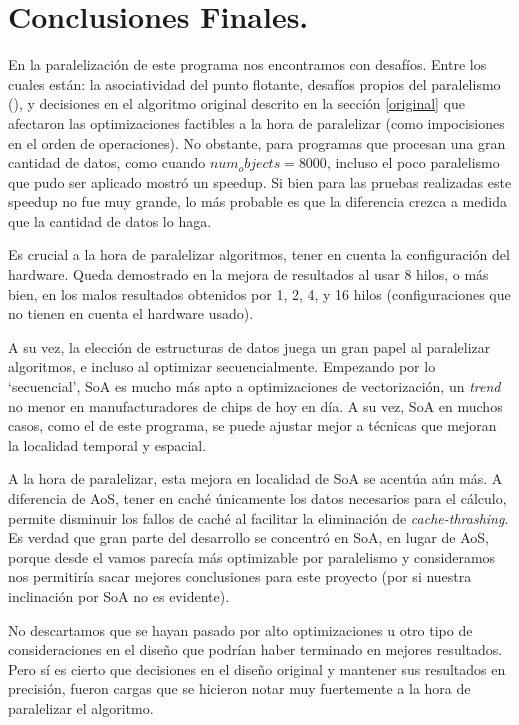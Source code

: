 \documentclass{article}
\begin{document}
\section{Conclusiones Finales.\label{conclusiones}}
En la paralelización de este programa nos encontramos con desafíos. Entre los cuales están: la asociatividad
del punto flotante, desafíos propios del paralelismo (), y decisiones en el algoritmo original descrito en
la sección \ref{original} que afectaron las optimizaciones factibles a la hora de paralelizar (como impocisiones
en el orden de operaciones). No obstante, para programas que procesan una gran cantidad de datos, como cuando ${num_objects=8000}$,
incluso el poco paralelismo que pudo ser aplicado mostró un speedup. Si bien para las pruebas realizadas este speedup no fue
muy grande, lo más probable es que la diferencia crezca a medida que la cantidad de datos lo haga.


Es crucial a la hora de paralelizar algoritmos, tener en cuenta la configuración del hardware. Queda demostrado
en la mejora de resultados al usar 8 hilos, o más bien, en los malos resultados obtenidos por 1, 2, 4, y 16 hilos (configuraciones
que no tienen en cuenta el hardware usado).


A su vez, la elección de estructuras de datos juega un gran papel al paralelizar algoritmos, e incluso al optimizar secuencialmente.
Empezando por lo `secuencial', SoA es mucho más apto a optimizaciones de vectorización, un \textit{trend} no menor en manufacturadores
de chips de hoy en día. A su vez, SoA en muchos casos, como el de este programa, se puede ajustar mejor a técnicas que mejoran
la localidad temporal y espacial.

A la hora de paralelizar, esta mejora en localidad de SoA se acentúa aún más. A diferencia de AoS, tener en caché únicamente
los datos necesarios para el cálculo, permite disminuir los fallos de caché al
facilitar la eliminación de \textit{cache-thrashing}. Es verdad que gran parte del desarrollo se concentró en SoA, en lugar de AoS, porque
desde el vamos parecía más optimizable por paralelismo y consideramos nos permitiría sacar mejores conclusiones para este proyecto (por
si nuestra inclinación por SoA no es evidente).

No descartamos que se hayan pasado por alto optimizaciones u otro tipo de consideraciones
en el diseño que podrían haber terminado en mejores resultados. Pero sí es cierto que decisiones
en el diseño original y mantener sus resultados en precisión, fueron cargas que se hicieron
notar muy fuertemente a la hora de paralelizar el algoritmo.
\end{document}

